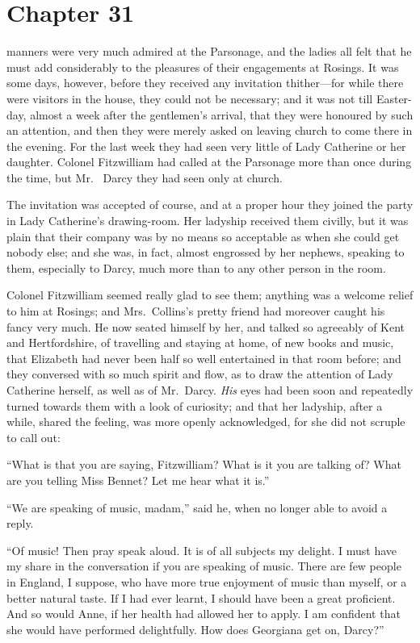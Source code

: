 \chapter{Chapter 31}


 manners were very much admired at the
Parsonage, and the ladies all felt that he must add considerably
to the pleasures of their engagements at Rosings.  It was some
days, however, before they received any invitation thither---for
while there were visitors in the house, they could not be
necessary; and it was not till Easter-day, almost a week after the
gentlemen's arrival, that they were honoured by such an
attention, and then they were merely asked on leaving church to
come there in the evening.  For the last week they had seen very
little of Lady Catherine or her daughter.  Colonel Fitzwilliam had
called at the Parsonage more than once during the time, but Mr.\ %
Darcy they had seen only at church.

The invitation was accepted of course, and at a proper hour they
joined the party in Lady Catherine's drawing-room.  Her ladyship
received them civilly, but it was plain that their company was by
no means so acceptable as when she could get nobody else; and
she was, in fact, almost engrossed by her nephews, speaking to
them, especially to Darcy, much more than to any other person
in the room.

Colonel Fitzwilliam seemed really glad to see them; anything
was a welcome relief to him at Rosings; and Mrs.\ Collins's
pretty friend had moreover caught his fancy very much.  He now
seated himself by her, and talked so agreeably of Kent and
Hertfordshire, of travelling and staying at home, of new books
and music, that Elizabeth had never been half so well entertained
in that room before; and they conversed with so much spirit and
flow, as to draw the attention of Lady Catherine herself, as well
as of Mr.\ Darcy.  \emph{His} eyes had been soon and repeatedly turned
towards them with a look of curiosity; and that her ladyship,
after a while, shared the feeling, was more openly acknowledged,
for she did not scruple to call out:

``What is that you are saying, Fitzwilliam?  What is it you are
talking of?  What are you telling Miss Bennet?  Let me hear
what it is.''

``We are speaking of music, madam,'' said he, when no longer
able to avoid a reply.

``Of music!  Then pray speak aloud.  It is of all subjects my
delight.  I must have my share in the conversation if you are
speaking of music.  There are few people in England, I suppose,
who have more true enjoyment of music than myself, or a better
natural taste.  If I had ever learnt, I should have been a great
proficient.  And so would Anne, if her health had allowed her to
apply.  I am confident that she would have performed delightfully.
How does Georgiana get on, Darcy?''

